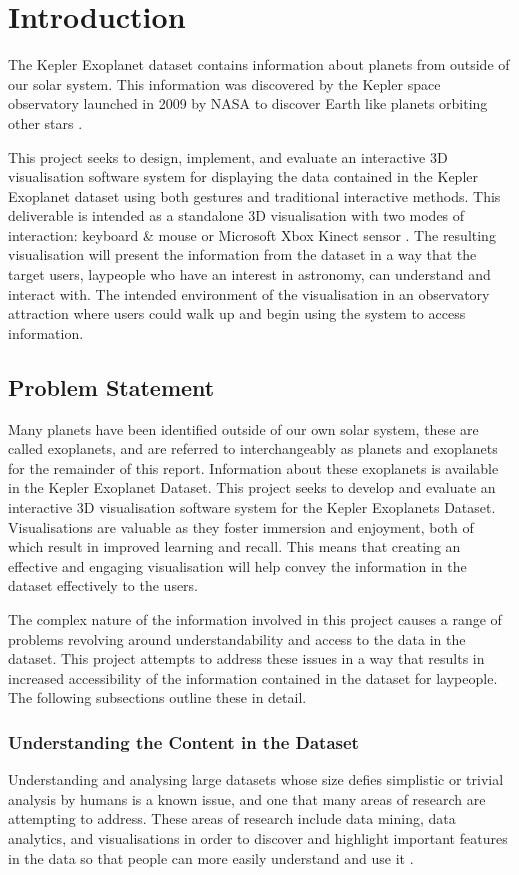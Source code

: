 \chapter{Introduction}\label{C:intro}
The Kepler Exoplanet dataset \cite{datasetphl} \cite{dataset}  contains
information about planets from outside of
our solar system. This information was discovered by the Kepler space
observatory launched in 2009 by NASA
to discover Earth like planets orbiting other stars \cite{keplerTele}.

This project seeks to design, implement, and evaluate an interactive 3D
visualisation software system for displaying the data contained in the Kepler
Exoplanet dataset using both gestures and traditional interactive methods. This
deliverable is intended as a standalone
3D visualisation with two modes of interaction: keyboard \& mouse or Microsoft
Xbox Kinect sensor \cite{kinect}. The resulting visualisation will present the
information from the dataset in a way that the target users, laypeople who have
an
interest in astronomy, can understand and interact with. The intended
environment of the visualisation in an observatory attraction where users could
walk up and begin using the system to access information.
\section{Problem Statement}
Many planets have been identified outside of our own solar system,
these are called exoplanets, and are referred to interchangeably as planets and
exoplanets for the remainder of this report. Information about these exoplanets
is available in the Kepler Exoplanet Dataset. This project seeks to develop and
evaluate an interactive 3D
visualisation software system for the Kepler Exoplanets Dataset. Visualisations
are valuable as they foster immersion and enjoyment, both of which result in
improved learning and recall. This means that
creating an effective and engaging visualisation will help convey the
information
in the dataset effectively to the users.

The complex nature of the information involved in this project causes a range of
problems revolving around understandability and access to the data in the
dataset. This project
attempts to address these issues in a way that results in increased
accessibility of the information contained in the dataset for laypeople. The
following subsections outline these in detail.

\subsection{Understanding the Content in the Dataset}
Understanding and analysing large datasets whose size defies simplistic or
trivial analysis by humans is a known issue, and one that many areas of research
are
attempting to address. These areas of research include data mining, data
analytics, and visualisations in order to discover and highlight important
features in the data so that people can more easily understand and use it
\cite{chan}. 

